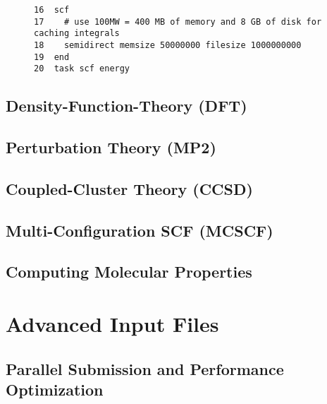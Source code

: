 \documentclass[letterpaper,12pt]{article}
\begin{document}
\begin{figure}
    \label{fig:SemidirectSCF2}
    \begin{verbatim}
16  scf
17    # use 100MW = 400 MB of memory and 8 GB of disk for caching integrals
18    semidirect memsize 50000000 filesize 1000000000
19  end
20  task scf energy
    \end{verbatim}
\end{figure}

\newpage

\subsection{Density-Function-Theory (DFT)}\label{sec:DensityFunctionTheory}

\newpage

\subsection{Perturbation Theory (MP2)}\label{sec:PerturbationTheory}

\newpage

\subsection{Coupled-Cluster Theory (CCSD)}\label{sec:CoupledClusterTheory}

\newpage

\subsection{Multi-Configuration SCF (MCSCF)}\label{sec:MultiConfigurationSCF}

\newpage

\subsection{Computing Molecular Properties}\label{sec:MolecularProperties}

\newpage

\section{Advanced Input Files}\label{sec:AdvancedInputFiles}

\newpage

\subsection{Parallel Submission and Performance Optimization}\label{sec:ParallelPerformance}
\end{document}
